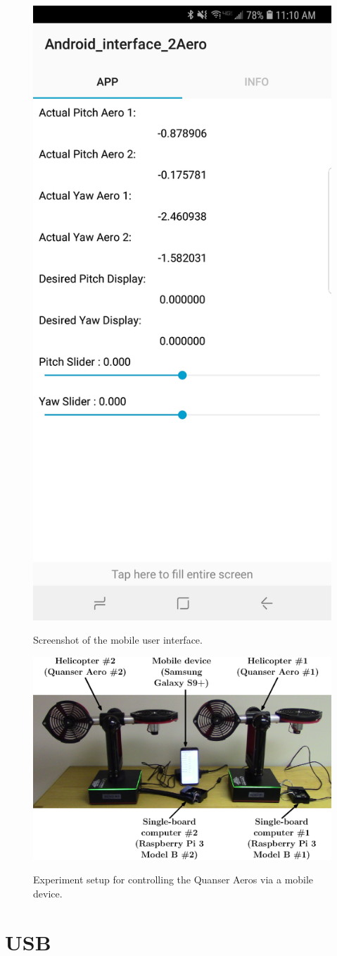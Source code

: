 \begin{figure}[!htbp]
    \centering
    \includegraphics[width=.46\textwidth,keepaspectratio=true]{figs/img/Screenshot_Android_Interface_2Aero}
    \label{fig:Screenshot_Android_Interface}
    \caption{Screenshot of the mobile user interface.}
\end{figure}

\begin{figure}[!htbp]
    \centering
    \includegraphics[width=.5\textwidth,keepaspectratio=true]{figs/ipe/Setup.eps}
    \label{fig:Setup}
    \caption{Experiment setup for controlling the Quanser Aeros via a mobile device.}
\end{figure}

\section{USB}
